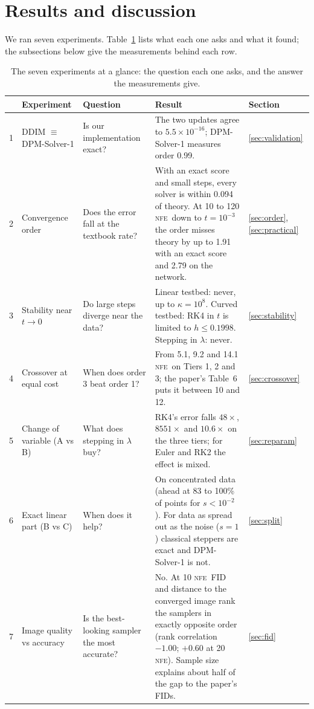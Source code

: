 \documentclass[sigconf]{acmart}
\newcommand{\NFE}{\textsc{nfe}}
\newcommand{\lam}{\lambda}
\begin{document}
\section{Results and discussion}

We ran seven experiments. Table~\ref{tab:summary} lists what each one asks and what
it found; the subsections below give the measurements behind each row.

\begin{table}[t]
\caption{The seven experiments at a glance: the question each one asks, and the
answer the measurements give.}
\label{tab:summary}
\small
\begin{tabular}{@{}r@{\hspace{6pt}}p{2.9cm}p{4.0cm}p{7.6cm}l@{}}
\toprule
& Experiment & Question & Result & Section \\
\midrule
1 & DDIM $\equiv$ DPM-Solver-1 & Is our implementation exact? &
  The two updates agree to $5.5\times10^{-16}$; DPM-Solver-1 measures order 0.99. &
  \ref{sec:validation} \\
2 & Convergence order & Does the error fall at the textbook rate? &
  With an exact score and small steps, every solver is within 0.094 of theory. At
  10 to 120 \NFE\ down to $t=10^{-3}$ the order misses theory by up to 1.91 with an
  exact score and 2.79 on the network. & \ref{sec:order}, \ref{sec:practical} \\
3 & Stability near $t\to0$ & Do large steps diverge near the data? &
  Linear testbed: never, up to $\kappa=10^8$. Curved testbed: RK4 in $t$ is limited
  to $h\le0.1998$. Stepping in $\lam$: never. & \ref{sec:stability} \\
4 & Crossover at equal cost & When does order 3 beat order 1? &
  From 5.1, 9.2 and 14.1 \NFE\ on Tiers 1, 2 and 3; the paper's Table~6 puts it
  between 10 and 12. & \ref{sec:crossover} \\
5 & Change of variable (A vs B) & What does stepping in $\lam$ buy? &
  RK4's error falls $48\times$, $8551\times$ and $10.6\times$ on the three tiers; for
  Euler and RK2 the effect is mixed. & \ref{sec:reparam} \\
6 & Exact linear part (B vs C) & When does it help? &
  On concentrated data (ahead at 83 to 100\% of points for $s<10^{-2}$). For data as
  spread out as the noise ($s=1$) classical steppers are exact and DPM-Solver-1 is
  not. & \ref{sec:split} \\
7 & Image quality vs accuracy & Is the best-looking sampler the most accurate? &
  No. At 10 \NFE\ FID and distance to the converged image rank the samplers in
  exactly opposite order (rank correlation $-1.00$; $+0.60$ at 20 \NFE). Sample size
  explains about half of the gap to the paper's FIDs. & \ref{sec:fid} \\
\bottomrule
\end{tabular}
\end{table}
\end{document}
